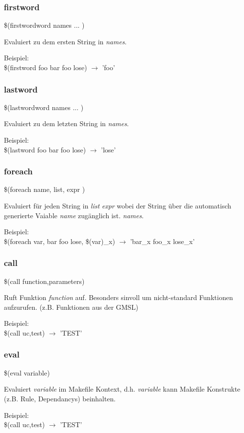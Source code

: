 \begin{frame}
	\frametitle{firstword}
	\begin{Large}\$(firstwordword names ... )\end{Large}

    \bigskip
	Evaluiert zu dem ersten String in \textit{names}.

    \bigskip 
    Beispiel: \\
	\$(firstword foo bar foo lose) $\longrightarrow$ 'foo'
\end{frame}

\begin{frame}
	\frametitle{lastword}
	\begin{Large}\$(lastwordword names ... )\end{Large}

    \bigskip
	Evaluiert zu dem letzten String in \textit{names}.

    \bigskip 
    Beispiel: \\
	\$(lastword foo bar foo lose) $\longrightarrow$ 'lose'
\end{frame}

\begin{frame}
	\frametitle{foreach}
	\begin{Large}\$(foreach name, list, expr )\end{Large}

    \bigskip
	Evaluiert für jeden String in \textit{list} \textit{expr} wobei der String über 
    die automatisch generierte Vaiable \textit{name} zugänglich ist. \textit{names}.

    \bigskip 
    Beispiel: \\
	\$(foreach var, bar foo lose, \$(var)\_x) $\longrightarrow$ 'bar\_x foo\_x lose\_x'
\end{frame}

\begin{frame}
	\frametitle{call}
	\begin{Large}\$(call function,parameters)\end{Large}

    \bigskip
	Ruft Funktion \textit{function} auf. Besonders sinvoll um nicht-standard
    Funktionen aufzurufen. (z.B. Funktionen aus der GMSL)

    \bigskip 
    Beispiel: \\
	\$(call uc,test) $\longrightarrow$ 'TEST'
\end{frame}

\begin{frame}
	\frametitle{eval}
	\begin{Large}\$(eval variable)\end{Large}

    \bigskip
	Evaluiert \textit{variable} im Makefile Kontext, d.h. \textit{variable} kann
    Makefile Konstrukte (z.B. Rule, Dependancys) beinhalten.

    \bigskip 
    Beispiel: \\
	\$(call uc,test) $\longrightarrow$ 'TEST'
\end{frame}
